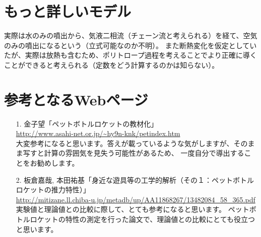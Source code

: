 \documentclass{article}
\begin{document}
\section{ もっと詳しいモデル }

実際は水のみの噴出から、気液二相流（チェーン流と考えられる）を経て、空気のみの噴出になるという（立式可能なのか不明）。
また断熱変化を仮定としていたが、実際は放熱も含むため、ポリトロープ過程を考えることでより正確に導くことができると考えられる（定数をどう計算するのかは知らない）。

\section{ 参考となるWebページ }

\begin{itemize}
\item[1.] 金子望「ペットボトルロケットの教材化」\\ \url{http://www.asahi-net.or.jp/~hy9n-knk/petindex.htm}
       \\ 大変参考になると思います。答えが載っているような気がしますが、そのまま写すと計算の雰囲気を見失う可能性があるため、
	      一度自分で導出することをお勧めします。
\item[2.] 板倉嘉哉, 本田祐基「身近な遊具等の工学的解析（その１：ペットボトルロケットの推力特性）」 \\ \url{http://mitizane.ll.chiba-u.jp/metadb/up/AA11868267/13482084_58_365.pdf}
       \\ 実験値と理論値との比較に際して、とても参考になると思います。
	      ペットボトルロケットの特性の測定を行った論文で、理論値との比較にとても役立つと思います。
\end{itemize}
\end{document}
